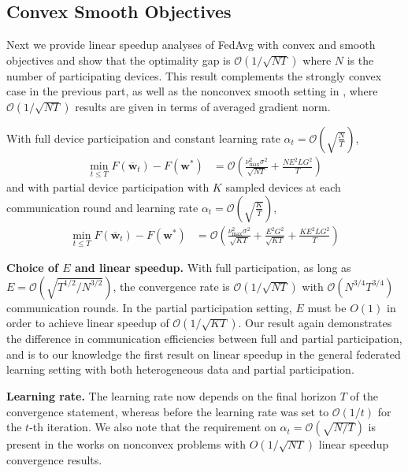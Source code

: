 \subsection{Convex Smooth Objectives}
Next we provide linear speedup analyses of FedAvg with convex and
smooth objectives and show that the optimality gap is $\mathcal{O}(1/\sqrt{NT})$
where $N$ is the number of participating devices. This result complements
the strongly convex case in the previous part, as well as the nonconvex
smooth setting in \cite{jiang2018linear,yu2019parallel,haddadpour2019convergence},
where $\mathcal{O}(1/\sqrt{NT})$ results are given in terms of averaged
gradient norm. 
\begin{theorem}
	\label{thm:SGD_cvx}With full device participation and constant learning
	rate $\alpha_{t}=\mathcal{O}(\sqrt{\frac{N}{T}})$, 
	\begin{align*}
	\min_{t\leq T}F(\overline{\mathbf{w}}_{t})-F(\mathbf{w}^{\ast}) & =\mathcal{O}(\frac{\nu_{\max}^{2}\sigma^{2}}{\sqrt{NT}}+\frac{NE^{2}LG^{2}}{T})
	\end{align*}
	and with partial device participation with $K$ sampled devices at
	each communication round and learning rate $\alpha_{t}=\mathcal{O}(\sqrt{\frac{K}{T}})$,
	\begin{align*}
	\min_{t\leq T}F(\overline{\mathbf{w}}_{t})-F(\mathbf{w}^{\ast}) & =\mathcal{O}(\frac{\nu_{\max}^{2}\sigma^{2}}{\sqrt{KT}}+\frac{E^{2}G^{2}}{\sqrt{KT}}+\frac{KE^{2}LG^{2}}{T})
	\end{align*}
\end{theorem}
%
\begin{remark}
	\textbf{Choice of $E$ and linear speedup. }With full participation,
	as long as $E=\mathcal{O}(\sqrt{T^{1/2}/N^{3/2}})$, the convergence
	rate is $\mathcal{O}(1/\sqrt{NT})$ with $\mathcal{O}(N^{3/4}T^{3/4})$
	communication rounds. In the partial participation setting, $E$ must
	be $O(1)$ in order to achieve linear speedup of $\mathcal{O}(1/\sqrt{KT})$.
	Our result again demonstrates the difference in communication efficiencies
	between full and partial participation, and is to our knowledge the
	first result on linear speedup in the general federated learning setting
	with both heterogeneous data and partial participation. 
\end{remark}
%
\begin{remark}
	\textbf{Learning rate. }The learning rate now depends on the final
	horizon $T$ of the convergence statement, whereas before the learning
	rate was set to $\mathcal{O}(1/t)$ for the $t$-th iteration. We
	also note that the requirement on $\alpha_{t}=\mathcal{O}(\sqrt{N/T})$
	is present in the works \cite{haddadpour2019convergence,yu2019parallel}
	on nonconvex problems with $O(1/\sqrt{NT})$ linear speedup convergence
	results. 
\end{remark}
